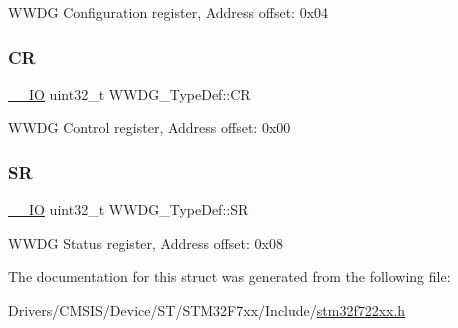 W\+W\+DG Configuration register, Address offset\+: 0x04 \mbox{\label{struct_w_w_d_g___type_def_a4caf530d45f7428c9700d9c0057135f8}} 
\subsubsection{\texorpdfstring{CR}{CR}}
{\footnotesize\ttfamily \mbox{\hyperlink{core__sc300_8h_aec43007d9998a0a0e01faede4133d6be}{\+\_\+\+\_\+\+IO}} uint32\+\_\+t W\+W\+D\+G\+\_\+\+Type\+Def\+::\+CR}

W\+W\+DG Control register, Address offset\+: 0x00 \mbox{\label{struct_w_w_d_g___type_def_a15655cda4854cc794db1f27b3c0bba38}} 
\subsubsection{\texorpdfstring{SR}{SR}}
{\footnotesize\ttfamily \mbox{\hyperlink{core__sc300_8h_aec43007d9998a0a0e01faede4133d6be}{\+\_\+\+\_\+\+IO}} uint32\+\_\+t W\+W\+D\+G\+\_\+\+Type\+Def\+::\+SR}

W\+W\+DG Status register, Address offset\+: 0x08 

The documentation for this struct was generated from the following file\+:\begin{DoxyCompactItemize}
\item 
Drivers/\+C\+M\+S\+I\+S/\+Device/\+S\+T/\+S\+T\+M32\+F7xx/\+Include/\mbox{\hyperlink{stm32f722xx_8h}{stm32f722xx.\+h}}\end{DoxyCompactItemize}
